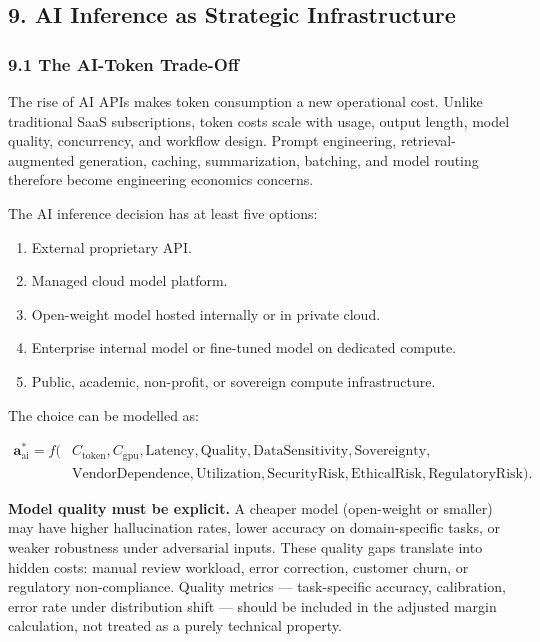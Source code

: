 \documentclass[
]{article}
\providecommand{\tightlist}{%
  \setlength{\itemsep}{0pt}\setlength{\parskip}{0pt}}
\begin{document}
\subsection{9. AI Inference as Strategic
Infrastructure}\label{ai-inference-as-strategic-infrastructure}

\subsubsection{9.1 The AI-Token Trade-Off}\label{the-ai-token-trade-off}

The rise of AI APIs makes token consumption a new operational cost.
Unlike traditional SaaS subscriptions, token costs scale with usage,
output length, model quality, concurrency, and workflow design. Prompt
engineering, retrieval-augmented generation, caching, summarization,
batching, and model routing therefore become engineering economics
concerns.

The AI inference decision has at least five options:

\begin{enumerate}
\def\labelenumi{\arabic{enumi}.}
\tightlist
\item
  External proprietary API.
\item
  Managed cloud model platform.
\item
  Open-weight model hosted internally or in private cloud.
\item
  Enterprise internal model or fine-tuned model on dedicated compute.
\item
  Public, academic, non-profit, or sovereign compute infrastructure.
\end{enumerate}

The choice can be modelled as:

\[\begin{aligned}
\mathbf{a}^{*}_{\mathrm{ai}} = f(&C_{\mathrm{token}}, C_{\mathrm{gpu}}, \mathrm{Latency}, \mathrm{Quality}, \mathrm{DataSensitivity}, \mathrm{Sovereignty},\\
&\mathrm{VendorDependence}, \mathrm{Utilization}, \mathrm{SecurityRisk}, \mathrm{EthicalRisk}, \mathrm{RegulatoryRisk}).
\end{aligned}\]

\textbf{Model quality must be explicit.} A cheaper model (open-weight or
smaller) may have higher hallucination rates, lower accuracy on
domain-specific tasks, or weaker robustness under adversarial inputs.
These quality gaps translate into hidden costs: manual review workload,
error correction, customer churn, or regulatory non-compliance. Quality
metrics --- task-specific accuracy, calibration, error rate under
distribution shift --- should be included in the adjusted margin
calculation, not treated as a purely technical property.
\end{document}
